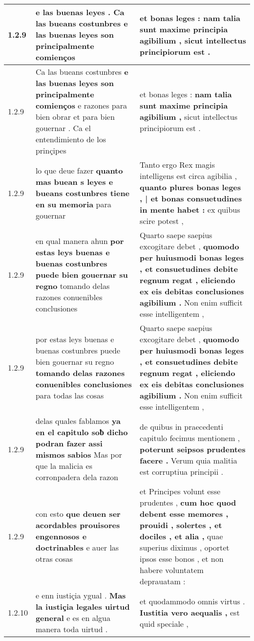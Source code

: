 \begin{tabular}{|p{1cm}|p{6.5cm}|p{6.5cm}|}
1.2.9 & e las buenas leyes . \textbf{ Ca las bueans costunbres } e las buenas leyes son principalmente comienços & et bonas leges : \textbf{ nam talia sunt maxime principia agibilium , } sicut intellectus principiorum est . \\\hline
1.2.9 & Ca las bueans costunbres \textbf{ e las buenas leyes son principalmente comienços } e razones para bien obrar et para bien gouernar . Ca el entendimiento de los prinçipes & et bonas leges : \textbf{ nam talia sunt maxime principia agibilium , } sicut intellectus principiorum est . \\\hline
1.2.9 & lo que deue fazer \textbf{ quanto mas buean s leyes e bueans costunbres tiene en su memoria } para gouernar & Tanto ergo Rex magis intelligens est circa agibilia , \textbf{ quanto plures bonas leges , | et bonas consuetudines in mente habet : } ex quibus scire potest , \\\hline
1.2.9 & en qual manera ahun \textbf{ por estas leys buenas e buenas costunbres puede bien gouernar su regno } tomando delas razones conuenibles conclusiones & Quarto saepe saepius excogitare debet , \textbf{ quomodo per huiusmodi bonas leges , et consuetudines debite regnum regat , eliciendo ex eis debitas conclusiones agibilium . } Non enim sufficit esse intelligentem , \\\hline
1.2.9 & por estas leys buenas e buenas costunbres puede bien gouernar su regno \textbf{ tomando delas razones conuenibles conclusiones } para todas las cosas & Quarto saepe saepius excogitare debet , \textbf{ quomodo per huiusmodi bonas leges , et consuetudines debite regnum regat , eliciendo ex eis debitas conclusiones agibilium . } Non enim sufficit esse intelligentem , \\\hline
1.2.9 & delas quales fablamos \textbf{ ya en el capitulo soƀ dicho podran fazer assi mismos sabios } Mas por que la malicia es corronpadera dela razon & de quibus in praecedenti capitulo fecimus mentionem , \textbf{ poterunt seipsos prudentes facere . } Verum quia malitia est corruptiua principii . \\\hline
1.2.9 & con esto \textbf{ que deuen ser acordables prouisores engennosos e doctrinables } e auer las otras cosas & et Principes volunt esse prudentes , \textbf{ cum hoc quod debent esse memores , prouidi , solertes , et dociles , et alia , } quae superius diximus , oportet ipsos esse bonos , et non habere voluntatem deprauatam : \\\hline
1.2.10 & e enn iustiçia ygual . \textbf{ Mas la iustiçia legales uirtud general } e es en algua manera toda uirtud . & et quodammodo omnis virtus . \textbf{ Iustitia vero aequalis , } est quid speciale , \\\hline

\end{tabular}
